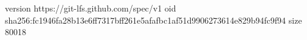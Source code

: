 version https://git-lfs.github.com/spec/v1
oid sha256:fc1946fa28b13e6ff7317bff261e5afafbc1af51d9906273614e829b94fc9f94
size 80018
